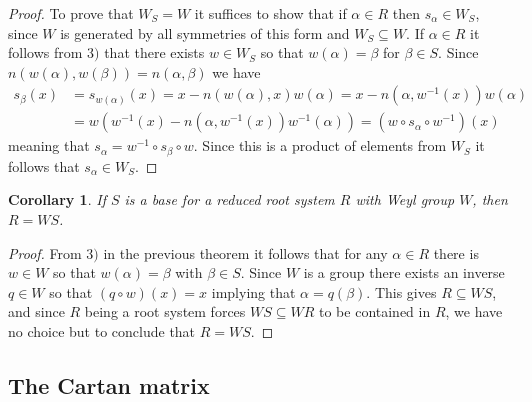 \documentclass[twoside,utf8]{article}
\theoremstyle{plain}
\newtheorem*{corollary}{Corollary}
\theoremstyle{definition}
\theoremstyle{remark}
\begin{document}
\begin{proof}
To prove that $W_S=W$ it suffices to show that if $\alpha \in R$ then $s_\alpha \in W_S$, since $W$ is generated by all symmetries of this form and $W_S\subseteq W$. If $\alpha \in R$ it follows from $3)$ that there exists $w\in W_S$ so that $w(\alpha)=\beta$ for $\beta \in S$. Since $n(w(\alpha),w(\beta))=n(\alpha,\beta)$ we have
\[
\begin{aligned}
s_\beta(x)
&= s_{w(\alpha)}(x)
= x-n(w(\alpha),x)w(\alpha)
= x-n(\alpha,w^{-1}(x))w(\alpha) \\
&= w\left( w^{-1}(x)-n(\alpha,w^{-1}(x))w^{-1}(\alpha) \right)
= (w \circ  s_\alpha \circ w^{-1})(x)
\end{aligned}
\]
meaning that $s_\alpha = w^{-1}\circ s_\beta \circ w$. Since this is a product of elements from $W_S$ it follows that $s_\alpha \in W_S$.
\end{proof}



\begin{corollary} \label{Cor:RisWS}
If $S$ is a base for a reduced root system $R$ with Weyl group $W$, then $R=WS$. 
\end{corollary}
\begin{proof}
From $3)$ in the previous theorem it follows that for any $\alpha \in R$ there is $w\in W$ so that $w(\alpha)=\beta$ with $\beta \in S$. Since $W$ is a group there exists an inverse $q\in W$ so that $(q \circ w)(x)=x$ implying that $\alpha = q(\beta)$. This gives $R \subseteq WS$, and since $R$ being a root system forces $WS \subseteq WR$ to be contained in $R$, we have no choice but to conclude that $R=WS$.
\end{proof}



\subsection{The Cartan matrix}
\end{document}
